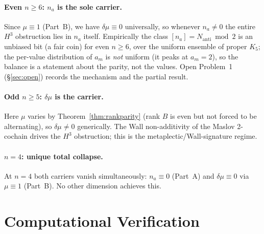 \documentclass[11pt,a4paper]{article}
\newcommand{\Nanti}{N_{\mathrm{anti}}}
\theoremstyle{plain}
\theoremstyle{definition}
\theoremstyle{remark}
\begin{document}
\paragraph{\texorpdfstring{Even $n \geq 6$: $n_a$ is the sole carrier.}{Even n≥6: n\_a is the sole carrier.}}
Since $\mu \equiv 1$ (Part~B), we have $\delta\mu \equiv 0$ universally,
so whenever $n_a \neq 0$ the entire $H^3$ obstruction lies in $n_a$ itself.
Empirically the class $[n_a] = \Nanti \bmod 2$ is an unbiased bit (a fair coin)
for even $n \geq 6$, over the uniform ensemble of proper $K_5$; the per-value
distribution of $a_m$ is \emph{not} uniform (it peaks at $a_m = 2$), so the
balance is a statement about the parity, not the values. Open Problem~1
(\S\ref{sec:open}) records the mechanism and the partial result.

\paragraph{\texorpdfstring{Odd $n \geq 5$: $\delta\mu$ is the carrier.}{Odd n>=5: delta-mu is the carrier.}}
Here $\mu$ varies by Theorem~\ref{thm:rankparity} (rank $B$ is even
but not forced to be alternating), so $\delta\mu \neq 0$ generically.
The Wall non-additivity of the Maslov 2-cochain drives the $H^3$
obstruction; this is the metaplectic/Wall-signature regime.

\paragraph{\texorpdfstring{$n = 4$: unique total collapse.}{n=4: unique total collapse.}}
At $n = 4$ both carriers vanish simultaneously:
$n_a \equiv 0$ (Part~A) and $\delta\mu \equiv 0$ via $\mu \equiv 1$ (Part~B).
No other dimension achieves this.

\section{Computational Verification}
\label{sec:computation}
\end{document}
